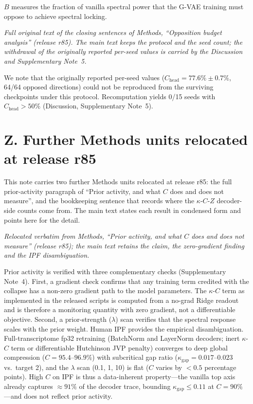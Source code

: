 \documentclass[11 pt,a4 paper]{article}
\begin{document}
$B$ measures the fraction of vanilla spectral power that the G-VAE training must oppose to achieve spectral locking.

\noindent\emph{Full original text of the closing sentences of Methods, ``Opposition budget analysis'' (release r85). The main text keeps the protocol and the seed count; the withdrawal of the originally reported per-seed values is carried by the Discussion and Supplementary Note~5.}

We note that the originally reported per-seed values ($C_{\text{head}}=77.6\%\pm0.7\%$, 64/64 opposed directions) could not be reproduced from the surviving checkpoints under this protocol. Recomputation yields 0/15 seeds with $C_{\text{head}}>50\%$ (Discussion, Supplementary Note~5).


\clearpage

\section*{Z. Further Methods units relocated at release r85}

This note carries two further Methods units relocated at release r85: the full prior-activity paragraph of ``Prior activity, and what $C$ does and does not measure'', and the bookkeeping sentence that records where the $\kappa$-$C$-$Z$ decoder-side counts come from. The main text states each result in condensed form and points here for the detail.

\noindent\emph{Relocated verbatim from Methods, ``Prior activity, and what $C$ does and does not measure'' (release r85); the main text retains the claim, the zero-gradient finding and the IPF disambiguation.}

Prior activity is verified with three complementary checks (Supplementary Note~4). First, a gradient check confirms that any training term credited with the collapse has a non-zero gradient path to the model parameters. The $\kappa$-$C$ term as implemented in the released scripts is computed from a no-grad Ridge readout and is therefore a monitoring quantity with zero gradient, not a differentiable objective. Second, a prior-strength ($\lambda$) scan verifies that the spectral response scales with the prior weight. Human IPF provides the empirical disambiguation. Full-transcriptome fp32 retraining (BatchNorm and LayerNorm decoders; inert $\kappa$-$C$ term or differentiable Hutchinson JVP penalty) converges to deep global compression ($C=95.4$--$96.9\%$) with subcritical gap ratio ($\kappa_{\mathrm{gap}}=0.017$--$0.023$ vs.\ target 2), and the $\lambda$ scan (0.1, 1, 10) is flat ($C$ varies by $<0.5$ percentage points). High $C$ on IPF is thus a data-inherent property---the vanilla top axis already captures $\approx91\%$ of the decoder trace, bounding $\kappa_{\mathrm{gap}}\leq0.11$ at $C=90\%$---and does not reflect prior activity.
\end{document}
